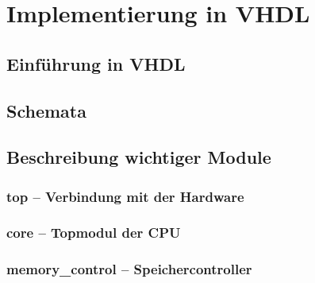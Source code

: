 \chapter{Implementierung in VHDL}
\label{c:vhdl}
\section{Einführung in VHDL}
\section{Schemata}
\pagebreak
\section{Beschreibung wichtiger Module}
\subsection{top -- Verbindung mit der Hardware}
\pagebreak
\subsection{core -- Topmodul der CPU}
\pagebreak
\subsection{memory\_control -- Speichercontroller}
\pagebreak
